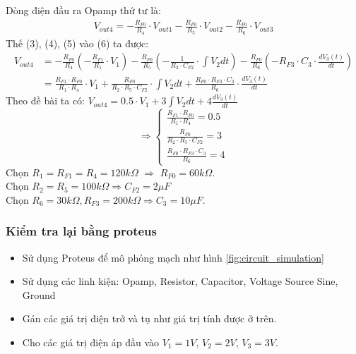 				\hspace*{0.6cm}Dòng điện đầu ra Opamp thứ tư là:
				\begin{align}
					V_{out4} = -\frac{R_{F0}}{R_4} \cdot V_{out1} - \frac{R_{F0}}{R_5} \cdot V_{out2} - \frac{R_{F0}}{R_6} \cdot V_{out3}
				\end{align}
				\hspace*{0.6cm}Thế (3), (4), (5) vào (6) ta được:
				\begin{align*}
					V_{out4} &= -\frac{R_{F0}}{R_4}\left(-\frac{R_{F1}}{R_1} \cdot V_1\right) - \frac{R_{F0}}{R_5}\left(-\frac{1}{R_2 \cdot C_{F2}} \cdot \int V_{2} dt\right) - \frac{R_{F0}}{R_6}\left(-R_{F3} \cdot C_{3} \cdot \frac{dV_{3}(t)}{dt}\right)\\
						 &= \frac{R_{F1} \cdot R_{F0}}{R_1 \cdot R_4} \cdot V_1 + \frac{R_{F0}}{R_2 \cdot R_5 \cdot C_{F2}} \cdot \int V_{2} dt + \frac{R_{F0} \cdot R_{F3} \cdot C_{3}}{R_6} \cdot \frac{dV_{3}(t)}{dt}
				\end{align*}
				\newpage
				Theo đề bài ta có: $V_{out4} = 0.5 \cdot V_1 + 3 \int V_{2} dt + 4 \frac{dV_{3}(t)}{dt}$ 
				\[
				\Rightarrow
				\begin{cases}
					\frac{R_{F1} \cdot R_{F0}}{R_1 \cdot R_4} = 0.5\\
					\frac{R_{F0}}{R_2 \cdot R_5 \cdot C_{F2}} = 3\\
					\frac{R_{F0} \cdot R_{F3} \cdot C_{3}}{R_6} = 4
				\end{cases}
				\]
				\hspace*{0.6cm}Chọn $R_{1} = R_{F1} = R_{4} = 120k\Omega$ $\Rightarrow$ $R_{F0} = 60k\Omega$.\\
				\hspace*{0.6cm}Chọn $R_{2} = R_{5} = 100k\Omega \Rightarrow C_{F2} = 2\mu F$\\
				\hspace*{0.6cm}Chọn $R_{6} = 30k\Omega, R_{F3} = 200k\Omega \Rightarrow C_{3} = 10\mu F$.\\
			\subsubsection{Kiểm tra lại bằng proteus}
				\begin{itemize}
					\item Sử dụng Proteus để mô phỏng mạch như hình \ref{fig:circuit_simulation}
					\item Sử dụng các linh kiện: Opamp, Resistor, Capacitor, Voltage Source Sine, Ground
					\item Gán các giá trị điện trở và tụ như giá trị tính được ở trên.
					\item Cho các giá trị điện áp đầu vào $V_1 = 1V$, $V_2 = 2V$, $V_3 = 3V$.
				\end{itemize}
		
		